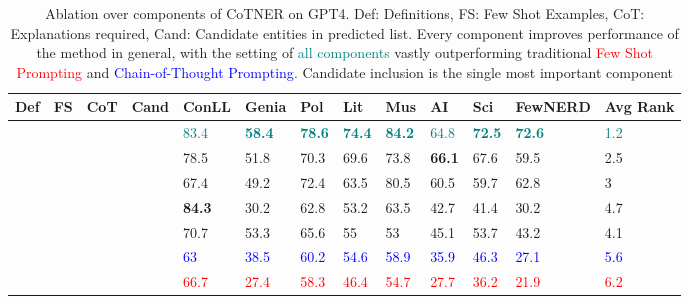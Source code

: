 \documentclass[11pt]{article}
\newcommand{\cmark}{\ding{51}}\newcommand{\xmark}{\ding{55}}\newcommand{\toolname}{PromptNER }
\begin{document}
\begin{table*}[ht]
    \centering
    \begin{tabular}{|l|l|l|l|l|l|l|l|l|l|l|l||l|}
    \hline
    Def & FS & CoT   & Cand & ConLL         & Genia         & Pol      & Lit    & Mus         & AI            & Sci       & FewNERD       & Avg Rank \\\hline
\textcolor{teal}{\cmark}        & \textcolor{teal}{\cmark}     & \textcolor{teal}{\cmark}  & \textcolor{teal}{\cmark}       & \textcolor{teal}{83.4}          & \textcolor{teal}{\textbf{58.4}} & \textcolor{teal}{\textbf{78.6}} & \textcolor{teal}{\textbf{74.4}} & \textcolor{teal}{\textbf{84.2}} & \textcolor{teal}{64.8}          & \textcolor{teal}{\textbf{72.5}} & \textcolor{teal}{\textbf{72.6}} & \textcolor{teal}{1.2}      \\
\cmark        & \cmark     & \cmark  & \xmark      & 78.5          & 51.8          & 70.3          & 69.6          & 73.8          & \textbf{66.1} & 67.6          & 59.5          & 2.5      \\
\cmark        & \cmark     & \xmark & \cmark       & 67.4          & 49.2          & 72.4          & 63.5          & 80.5          & 60.5          & 59.7          & 62.8          & 3        \\
\cmark        & \xmark    & \cmark  & \cmark       & \textbf{84.3} & 30.2          & 62.8          & 53.2          & 63.5          & 42.7          & 41.4          & 30.2          & 4.7      \\
\xmark       & \cmark     & \cmark  & \cmark       & 70.7          & 53.3          & 65.6          & 55            & 53            & 45.1          & 53.7          & 43.2          & 4.1      \\
\textcolor{blue}{\xmark}       & \textcolor{blue}{\cmark}     & \textcolor{blue}{\cmark}  & \textcolor{blue}{\xmark}      & \textcolor{blue}{63}            & \textcolor{blue}{38.5}          & \textcolor{blue}{60.2}          & \textcolor{blue}{54.6}          & \textcolor{blue}{58.9}          & \textcolor{blue}{35.9}          & \textcolor{blue}{46.3}          & \textcolor{blue}{27.1}          & \textcolor{blue}{5.6}      \\
\textcolor{red}{\xmark}       & \textcolor{red}{\cmark}     & \textcolor{red}{\xmark} & \textcolor{red}{\xmark}      & \textcolor{red}{66.7}          & \textcolor{red}{27.4}          & \textcolor{red}{58.3}          & \textcolor{red}{46.4}          & \textcolor{red}{54.7}          & \textcolor{red}{27.7}          & \textcolor{red}{36.2}          & \textcolor{red}{21.9}          & \textcolor{red}{6.2}  
 \\\hline
\end{tabular}
\caption{Ablation over components of CoTNER on GPT4. Def: Definitions, FS: Few Shot Examples, CoT: Explanations required, Cand: Candidate entities in predicted list. Every component improves performance of the method in general, with the setting of \textcolor{teal}{all components} vastly outperforming traditional \textcolor{red}{Few Shot Prompting} and \textcolor{blue}{Chain-of-Thought Prompting}. Candidate inclusion is the single most important component}
\label{table:gpt4_ablation}
\end{table*} 
\end{document}

